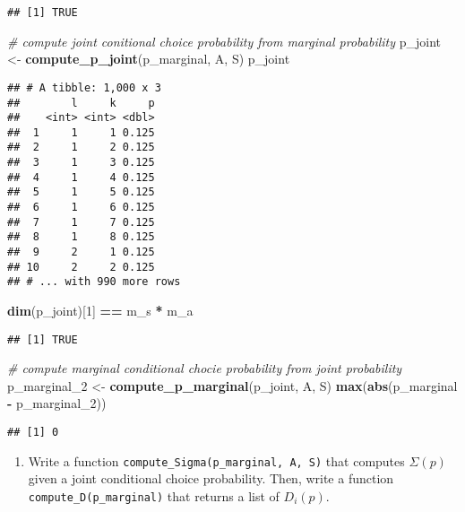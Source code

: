 \documentclass[
]{book}
\newenvironment{Shaded}{\begin{snugshade}}{\end{snugshade}}
\newcommand{\CommentTok}[1]{\textcolor[rgb]{0.56,0.35,0.01}{\textit{#1}}}
\newcommand{\DecValTok}[1]{\textcolor[rgb]{0.00,0.00,0.81}{#1}}
\newcommand{\KeywordTok}[1]{\textcolor[rgb]{0.13,0.29,0.53}{\textbf{#1}}}
\newcommand{\NormalTok}[1]{#1}
\newcommand{\OperatorTok}[1]{\textcolor[rgb]{0.81,0.36,0.00}{\textbf{#1}}}
\newcommand{\StringTok}[1]{\textcolor[rgb]{0.31,0.60,0.02}{#1}}
\providecommand{\tightlist}{%
  \setlength{\itemsep}{0pt}\setlength{\parskip}{0pt}}
\begin{document}
\begin{verbatim}
## [1] TRUE
\end{verbatim}

\begin{Shaded}
\begin{Highlighting}[]
\CommentTok{# compute joint conitional choice probability from marginal probability}
\NormalTok{p_joint <-}\StringTok{ }\KeywordTok{compute_p_joint}\NormalTok{(p_marginal, A, S)}
\NormalTok{p_joint}
\end{Highlighting}
\end{Shaded}

\begin{verbatim}
## # A tibble: 1,000 x 3
##        l     k     p
##    <int> <int> <dbl>
##  1     1     1 0.125
##  2     1     2 0.125
##  3     1     3 0.125
##  4     1     4 0.125
##  5     1     5 0.125
##  6     1     6 0.125
##  7     1     7 0.125
##  8     1     8 0.125
##  9     2     1 0.125
## 10     2     2 0.125
## # ... with 990 more rows
\end{verbatim}

\begin{Shaded}
\begin{Highlighting}[]
\KeywordTok{dim}\NormalTok{(p_joint)[}\DecValTok{1}\NormalTok{] }\OperatorTok{==}\StringTok{ }\NormalTok{m_s }\OperatorTok{*}\StringTok{ }\NormalTok{m_a}
\end{Highlighting}
\end{Shaded}

\begin{verbatim}
## [1] TRUE
\end{verbatim}

\begin{Shaded}
\begin{Highlighting}[]
\CommentTok{# compute marginal conditional chocie probability from joint probability}
\NormalTok{p_marginal_}\DecValTok{2}\NormalTok{ <-}\StringTok{ }\KeywordTok{compute_p_marginal}\NormalTok{(p_joint, A, S)}
\KeywordTok{max}\NormalTok{(}\KeywordTok{abs}\NormalTok{(p_marginal }\OperatorTok{-}\StringTok{ }\NormalTok{p_marginal_}\DecValTok{2}\NormalTok{))}
\end{Highlighting}
\end{Shaded}

\begin{verbatim}
## [1] 0
\end{verbatim}

\begin{enumerate}
\def\labelenumi{\arabic{enumi}.}
\setcounter{enumi}{5}
\tightlist
\item
  Write a function \texttt{compute\_Sigma(p\_marginal,\ A,\ S)} that computes \(\Sigma(p)\) given a joint conditional choice probability. Then, write a function \texttt{compute\_D(p\_marginal)} that returns a list of \(D_i(p)\).
\end{enumerate}
\end{document}

